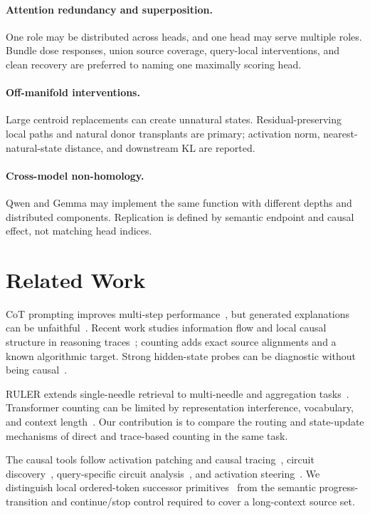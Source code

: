 \paragraph{Attention redundancy and superposition.}
One role may be distributed across heads, and one head may serve multiple roles. Bundle dose responses, union source coverage, query-local interventions, and clean recovery are preferred to naming one maximally scoring head.

\paragraph{Off-manifold interventions.}
Large centroid replacements can create unnatural states. Residual-preserving local paths and natural donor transplants are primary; activation norm, nearest-natural-state distance, and downstream KL are reported.

\paragraph{Cross-model non-homology.}
Qwen and Gemma may implement the same function with different depths and distributed components. Replication is defined by semantic endpoint and causal effect, not matching head indices.

\section{Related Work}

CoT prompting improves multi-step performance~\citep{wei2022cot}, but generated explanations can be unfaithful~\citep{turpin2023unfaithful}. Recent work studies information flow and local causal structure in reasoning traces~\citep{yang2026howcot,wei2026attricot}; counting adds exact source alignments and a known algorithmic target. Strong hidden-state probes can be diagnostic without being causal~\citep{yuan2026hidden}.

RULER extends single-needle retrieval to multi-needle and aggregation tasks~\citep{hsieh2024ruler}. Transformer counting can be limited by representation interference, vocabulary, and context length~\citep{yehudai2024count}. Our contribution is to compare the routing and state-update mechanisms of direct and trace-based counting in the same task.

The causal tools follow activation patching and causal
tracing~\citep{meng2022rome}, circuit discovery~\citep{conmy2023acdc},
query-specific circuit analysis~\citep{wang2022ioi}, and activation
steering~\citep{turner2023actadd}. We distinguish local ordered-token
successor primitives~\citep{gould2023successor} from the semantic
progress-transition and continue/stop control required to cover a
long-context source set.

